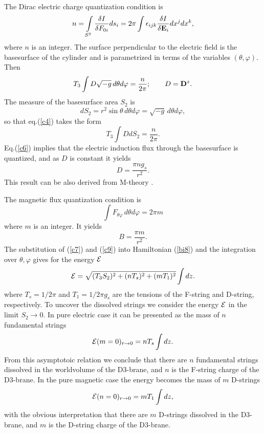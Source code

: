 \documentclass[a4paper,12pt]{article}
\begin{document}
The Dirac electric charge quantization condition is
\begin{equation}
n=\int\limits_{S^2}\frac{\delta I}{\delta F_{0i}}ds_i=
2\pi\int{\epsilon}_{ijk}\frac{\delta I}{\delta {{\bf E}}_i}dx^jdx^k,
\label{c2}
\end{equation}
where $n$ is an integer. The surface perpendicular to the electric field is 
the basesurface of the cylinder and is parametrized in terms of the variables 
$(\theta,\varphi)$. Then
\begin{equation}
T_3\int D\sqrt{-g}\,d\theta d\varphi=\frac{n}{2\pi};\qquad 
D={{\bf D}}^z.
\label{c4}
\end{equation}
The measure of the basesurface area $S_2$ is
\begin{equation}
dS_2=r^2\sin\theta\,d\theta d\varphi=\sqrt{-g}\,d\theta d\varphi,
\label{c5}
\end{equation}
so that eq.(\ref{c4}) takes the form
\begin{equation}
T_3\int DdS_2=\frac{n}{2\pi}. 
\label{c6}
\end{equation}
Eq.(\ref{c6}) implies that the electric induction flux through the basesurface is quantized, and as $D$ is constant it yields
\begin{equation}
D=\frac{\pi n g_s}{r^2}.
\label{c7}
\end{equation}
This result can be also derived from M-theory \cite{10,19}. 

\noindent

The magnetic flux quantization condition is
\begin{equation}
\int F_{\theta \varphi}\,d\theta d\varphi =2\pi m
\label{c8}
\end{equation}
where $m$ is an integer. It yields
\begin{equation}
B=\frac{\pi m}{r^2}.
\label{c9}
\end{equation}
The substitution of (\ref{c7}) and (\ref{c9}) into Hamiltonian (\ref{bi8}) 
and the integration over $\theta ,\varphi$ gives for the energy ${\cal E}$ 
\begin{equation}
{\cal E}=\sqrt{(T_3S_2)^2+(nT_s)^2+(mT_1)^2}\int dz.
\label{c10}
\end{equation}
where $T_s=1/2\pi$ and $T_1=1/2\pi g_s$ are the tensions of the F-string 
and D-string, respectively.
To uncover the dissolved strings we consider the energy ${\cal E}$ in the 
limit $S_2\rightarrow 0$. In pure electric case it can be presented as the 
mass of $n$ fundamental strings
\begin{equation}
{\cal E}(m=0)_{r\rightarrow 0}= nT_s\int dz.
\label{c11}
\end{equation}
From this asymptotoic relation we conclude that there are $n$ fundamental 
strings dissolved in the worldvolume of the D3-brane, and $n$ is 
the F-string charge of the D3-brane. In the pure magnetic case the energy 
becomes the mass of $m$ D-strings
\begin{equation}
{\cal E}(n=0)_{r\rightarrow 0}= mT_1\int dz,
\label{c12}
\end{equation}
with the obvious interpretation that there are $m$ D-strings dissolved in 
the D3-brane, and $m$ is the D-string charge of the D3-brane. 
\end{document}
